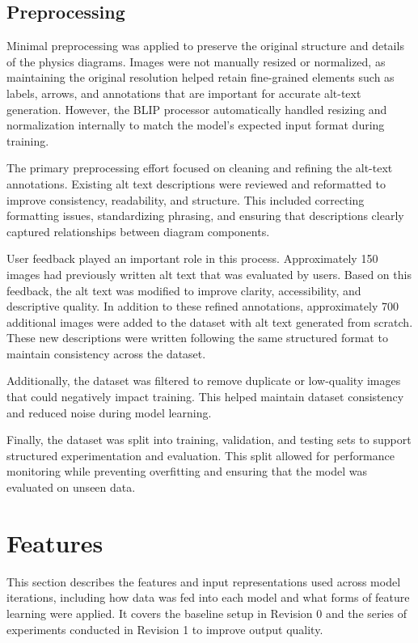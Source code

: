\documentclass[11pt]{article}
\begin{document}
\subsection{Preprocessing}

Minimal preprocessing was applied to preserve the original structure and details of the physics diagrams. Images were not manually resized or normalized, as maintaining the original resolution helped retain fine-grained elements such as labels, arrows, and annotations that are important for accurate alt-text generation. However, the BLIP processor automatically handled resizing and normalization internally to match the model's expected input format during training.

The primary preprocessing effort focused on cleaning and refining the alt-text annotations. Existing alt text descriptions were reviewed and reformatted to improve consistency, readability, and structure. This included correcting formatting issues, standardizing phrasing, and ensuring that descriptions clearly captured relationships between diagram components.

User feedback played an important role in this process. Approximately 150 images had previously written alt text that was evaluated by users. Based on this feedback, the alt text was modified to improve clarity, accessibility, and descriptive quality. In addition to these refined annotations, approximately 700 additional images were added to the dataset with alt text generated from scratch. These new descriptions were written following the same structured format to maintain consistency across the dataset.

Additionally, the dataset was filtered to remove duplicate or low-quality images that could negatively impact training. This helped maintain dataset consistency and reduced noise during model learning.

Finally, the dataset was split into training, validation, and testing sets to support structured experimentation and evaluation. This split allowed for performance monitoring while preventing overfitting and ensuring that the model was evaluated on unseen data.

\section{Features}

This section describes the features and input representations used across model iterations, including how data was fed into each model and what forms of feature learning were applied. It covers the baseline setup in Revision 0 and the series of experiments conducted in Revision 1 to improve output quality.
\end{document}
